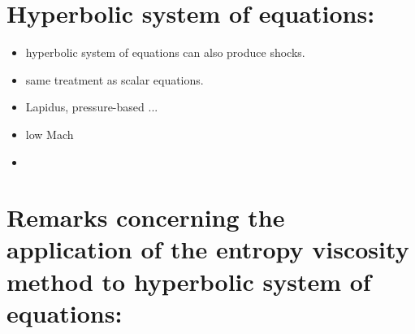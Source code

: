 \section{Hyperbolic system of equations:}
\begin{itemize}
\item hyperbolic system of equations can also produce shocks.
\item same treatment as scalar equations.
\item Lapidus, pressure-based ...
\item low Mach
\item 
\end{itemize}
\section{Remarks concerning the application of the entropy viscosity method to hyperbolic system of equations:}
